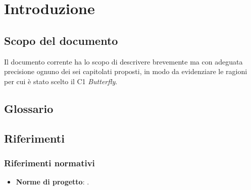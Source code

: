 \section{Introduzione} \label{introduzione}
    \subsection{Scopo del documento}
    Il documento corrente ha lo scopo di descrivere brevemente ma con adeguata precisione ognuno dei sei capitolati proposti,
    in modo da evidenziare le ragioni per cui è stato scelto il  C1 \textit{Butterfly}.

    \subsection{Glossario}
    

    \subsection{Riferimenti}

        \subsubsection{Riferimenti normativi}
            \begin{itemize}
                \item \textbf{Norme di progetto}: .
            \end{itemize}

